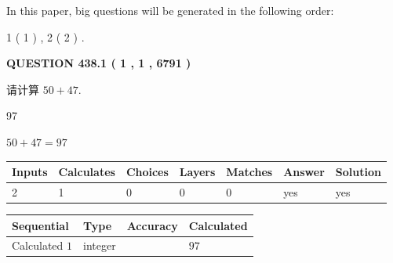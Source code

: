 \documentclass{ctexart}
\begin{document}
In this paper, big questions will be generated in the following order: 
   
   
   1 ( 1 )
 ,
   2 ( 2 )
 .
  
\vspace{0.2in}
  
{\textbf{\Large{QUESTION
438.1 
 ( 1 , 1 , 6791 )
}}}
  
  
 
请计算 $ %
50 +  %
47 $.
 
 
 
\noindent{}
 
 

97
 
 
\noindent{}
 
 

 
 
 
\noindent{}
 
 

$ %
50 +  %
47=   %
97$
 
 
\noindent{}
 
 

 
   
   
   
   
\noindent\begin{tabular}{|l|l|l|l|l|l|l|}
 \hline
Inputs & Calculates & Choices & Layers & Matches & Answer & Solution \\ \hline
 2  & 
 1  & 
 0
  & 
 0  & 
 0  & 
  yes & 
  yes 
  \\ \hline
 \end{tabular}
   
   
   
   
\noindent{}
   
   
  
  
\noindent\begin{tabular}{|l|l|l|l|}
\hline
 Sequential & Type & Accuracy & Calculated \\ 
\hline
 
 
  Calculated $  1 $ & integer &  & 
  $ 97 $ 
 \\  \hline  
 \end{tabular}
   
\end{document}
